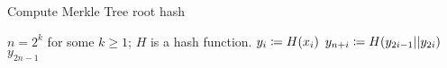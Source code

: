 \begin{algorithm}[p]
\caption{Compute Merkle Tree root hash}
\label{alg:merkle_tree}
\begin{algorithmic}[1]
\Require $n = 2^{k}$ for some $k\ge1$; $H$ is a \gls{hash function}.
        \State $y_{i} \coloneqq{} H(x_{i})$
    \EndFor
        \State $y_{n+i} \coloneqq{} H(y_{2i-1}||y_{2i})$
    \EndFor
    \State \Return $y_{2n-1}$
\EndProcedure
\end{algorithmic}
\end{algorithm}
